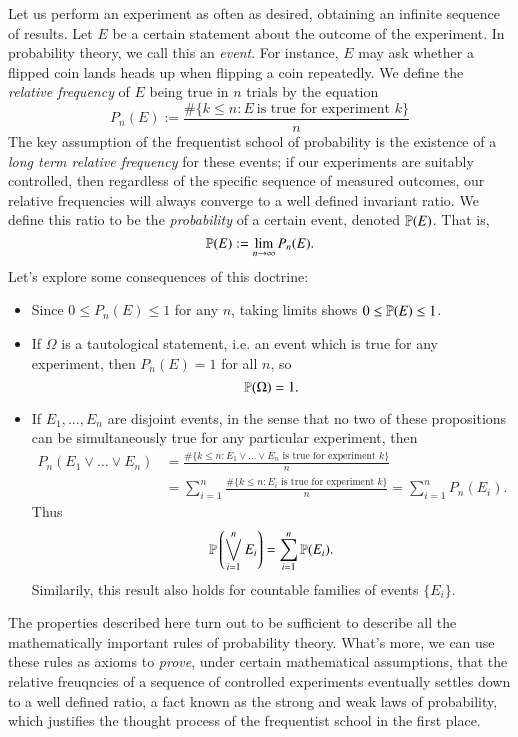 Let us perform an experiment as often as desired, obtaining an infinite sequence of results. Let $E$ be a certain statement about the outcome of the experiment. In probability theory, we call this an \emph{event}. For instance, $E$ may ask whether a flipped coin lands heads up when flipping a coin repeatedly. We define the \emph{relative frequency} of $E$ being true in $n$ trials by the equation
%
\[ P_n(E) := \frac{\# \{ k \leq n : E\ \text{is true for experiment $k$} \}}{n} \]
%
The key assumption of the frequentist school of probability is the existence of a \emph{long term relative frequency} for these events; if our experiments are suitably controlled, then regardless of the specific sequence of measured outcomes, our relative frequencies will always converge to a well defined invariant ratio. We define this ratio to be the \emph{probability} of a certain event, denoted $\mathbb{P}(E)$. That is,
%
\[ \mathbb{P}(E) := \lim_{n \to \infty} P_n(E). \]
%
Let's explore some consequences of this doctrine:
%
\begin{itemize}
    \item Since $0 \leq P_n(E) \leq 1$ for any $n$, taking limits shows $0 \leq \mathbb{P}(E) \leq 1$.

    \item If $\Omega$ is a tautological statement, i.e. an event which is true for any experiment, then $P_n(E) = 1$ for all $n$, so
    \[ \mathbb{P}(\Omega) = 1. \]

    \item If $E_1, \dots, E_n$ are disjoint events, in the sense that no two of these propositions can be simultaneously true for any particular experiment, then
    \begin{align*}
        P_n \left( E_1 \vee \dots \vee E_n \right) &= \frac{\# \{ k \leq n : \text{$E_1 \vee \dots \vee E_n$ is true for experiment $k$} \}}{n}\\
        &= \sum_{i = 1}^n \frac{\# \{ k \leq n : \text{$E_i$ is true for experiment $k$} \}}{n} = \sum_{i = 1}^n P_n(E_i).
    \end{align*}
    Thus
    \[ \mathbb{P} \left( \bigvee_{i = 1}^n E_i \right) = \sum_{i = 1}^n \mathbb{P}(E_i). \]
    Similarily, this result also holds for countable families of events $\{ E_i \}$.
\end{itemize}
%
The properties described here turn out to be sufficient to describe all the mathematically important rules of probability theory. What's more, we can use these rules as axioms to \emph{prove}, under certain mathematical assumptions, that the relative freuqncies of a sequence of controlled experiments eventually settles down to a well defined ratio, a fact known as the strong and weak laws of probability, which justifies the thought process of the frequentist school in the first place.

